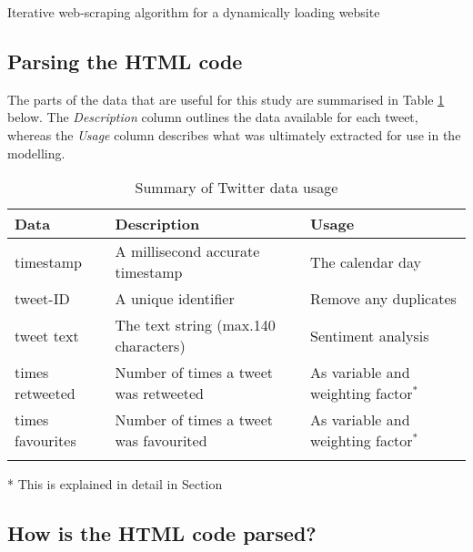 \documentclass{article}
\begin{document}
\begin{algorithm}[H]
 \caption{Iterative web-scraping algorithm for a dynamically loading website}
\end{algorithm}


\subsection{Parsing the HTML code}
\label{sec-3-3}
The parts of the data that are useful for this study are summarised in Table \ref{table:twitter-data-usage} below. The \emph{Description} column outlines the data available for each tweet, whereas the \emph{Usage} column describes what was ultimately extracted for use in the modelling.

\begin{table}[htb]
\centering
\begin{tabular}{l|l|l}
Data & Description & Usage\\
\hline
timestamp & A millisecond accurate timestamp & The calendar day\\
tweet-ID & A unique identifier & Remove any duplicates\\
tweet text & The text string (max.140 characters) & Sentiment analysis\\
times retweeted & Number of times a tweet was retweeted & As variable and weighting factor$^{\text{*}}$\\
times favourites & Number of times a tweet was favourited & As variable and weighting factor$^{\text{*}}$\\
 &  & \\
\end{tabular}\caption{\label{table:twitter-data-usage}Summary of Twitter data usage}

\end{table}

\mbox{*} This is explained in detail in Section 


\subsection{How is the HTML code parsed?}
\label{sec-3-4}
\end{document}
